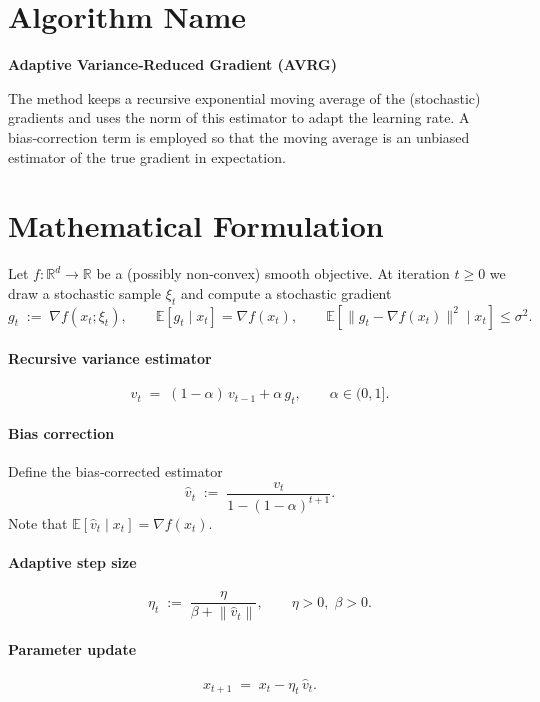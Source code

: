 \documentclass{article}
\newcommand{\EE}{\mathbb{E}}
\newcommand{\RR}{\mathbb{R}}
\newcommand{\norm}[1]{\left\|#1\right\|}
\newcommand{\grad}{\nabla}
\begin{document}
\section*{Algorithm Name}
\textbf{Adaptive Variance‑Reduced Gradient (AVRG)}  

The method keeps a recursive exponential moving average of the (stochastic) gradients and uses the norm of this estimator to adapt the learning rate.  A bias‑correction term is employed so that the moving average is an unbiased estimator of the true gradient in expectation.

\section*{Mathematical Formulation}
Let $f:\RR^{d}\to\RR$ be a (possibly non‑convex) smooth objective.  
At iteration $t\ge 0$ we draw a stochastic sample $\xi_t$ and compute a stochastic gradient
\[
g_t \;:=\; \grad f(x_t;\xi_t),\qquad 
\EE\!\left[g_t\mid x_t\right]=\grad f(x_t),\qquad
\EE\!\left[\|g_t-\grad f(x_t)\|^{2}\mid x_t\right]\le\sigma^{2}.
\]

\paragraph{Recursive variance estimator}
\[
v_t \;=\;(1-\alpha)\,v_{t-1}+ \alpha\, g_t,
\qquad \alpha\in(0,1].
\tag{1}
\]

\paragraph{Bias correction}
Define the bias‑corrected estimator
\[
\hat v_t \;:=\; \frac{v_t}{1-(1-\alpha)^{t+1}}.
\tag{2}
\]
Note that $\EE[\hat v_t\mid x_t]=\grad f(x_t)$.

\paragraph{Adaptive step size}
\[
\eta_t \;:=\; \frac{\eta}{\beta+\norm{\hat v_t}},\qquad 
\eta>0,\;\beta>0.
\tag{3}
\]

\paragraph{Parameter update}
\[
x_{t+1}\;=\;x_t-\eta_t\,\hat v_t .
\tag{4}
\]
\end{document}

